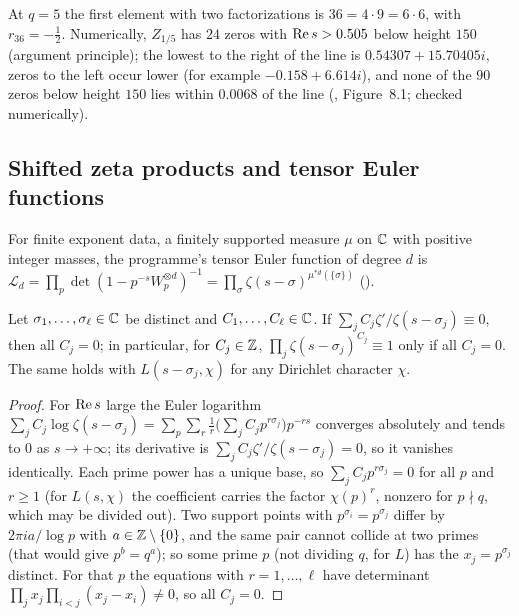 At $q=5$ the first element with two factorizations is $36=4\cdot9=6\cdot6$, with $r_{36}=-\tfrac12$. Numerically, $Z_{1/5}$ has $24$ zeros with $\operatorname{Re} s>0.505$ below height $150$ (argument principle); the lowest to the right of the line is $0.54307+15.70405i$, zeros to the left occur lower (for example $-0.158+6.614i$), and none of the $90$ zeros below height $150$ lies within $0.0068$ of the line (, Figure~8.1; checked numerically).

\subsection{Shifted zeta products and tensor Euler functions}

For finite exponent data, a finitely supported measure $\mu$ on $\mathbb{C}$ with positive integer masses, the programme's tensor Euler function of degree $d$ is $\mathcal{L}_d=\prod_p\det(1-p^{-s}W_p^{\otimes d})^{-1}=\prod_\sigma\zeta(s-\sigma)^{\mu^{*d}(\{\sigma\})}$ ().

\begin{lemma}\label{lem:shifted}
Let $\sigma_1,\dots,\sigma_\ell\in\mathbb{C}$ be distinct and $C_1,\dots,C_\ell\in\mathbb{C}$. If $\sum_jC_j\zeta'/\zeta(s-\sigma_j)\equiv0$, then all $C_j=0$; in particular, for $C_j\in\mathbb{Z}$, $\prod_j\zeta(s-\sigma_j)^{C_j}\equiv1$ only if all $C_j=0$. The same holds with $L(s-\sigma_j,\chi)$ for any Dirichlet character $\chi$.
\end{lemma}

\begin{proof}
For $\operatorname{Re} s$ large the Euler logarithm $\sum_jC_j\log\zeta(s-\sigma_j)=\sum_p\sum_r\frac1r\big(\sum_jC_jp^{r\sigma_j}\big)p^{-rs}$ converges absolutely and tends to $0$ as $s\to+\infty$; its derivative is $\sum_jC_j\zeta'/\zeta(s-\sigma_j)=0$, so it vanishes identically. Each prime power has a unique base, so $\sum_jC_jp^{r\sigma_j}=0$ for all $p$ and $r\ge1$ (for $L(s,\chi)$ the coefficient carries the factor $\chi(p)^r$, nonzero for $p\nmid q$, which may be divided out). Two support points with $p^{\sigma_i}=p^{\sigma_j}$ differ by $2\pi ia/\log p$ with $a\in\mathbb{Z}\setminus\{0\}$, and the same pair cannot collide at two primes (that would give $p^b=q^a$); so some prime $p$ (not dividing $q$, for $L$) has the $x_j=p^{\sigma_j}$ distinct. For that $p$ the equations with $r=1,\dots,\ell$ have determinant $\prod_jx_j\prod_{i<j}(x_j-x_i)\ne0$, so all $C_j=0$.
\end{proof}

